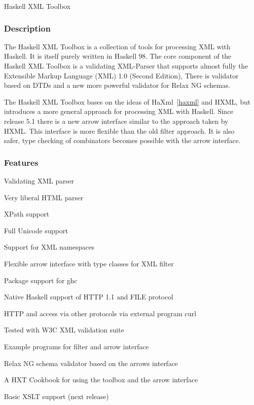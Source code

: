 \begin{hcarentry}[updated]{Haskell XML Toolbox}
\label{hxt}
\makeheader

\subsubsection*{Description}

The Haskell XML Toolbox is a collection of tools for processing XML with
Haskell. It is itself purely written in Haskell 98. The core component of the
Haskell XML Toolbox is a validating XML-Parser that supports
almost fully the Extensible Markup Language (XML) 1.0 (Second Edition),
There is validator based on DTDs and a new more powerful validator for
Relax NG schemas.

The Haskell XML Toolbox bases on the ideas of HaXml~\cref{haxml} and HXML,
but introduces a more general approach for processing XML with Haskell.
Since release 5.1 there is a new arrow interface similar to the approach
taken by HXML. This interface is more flexible than the old filter approach.
It is also safer, type checking of combinators becomes possible with the arrow
interface.

\subsubsection*{Features}

\begin{compactitem}
\item Validating XML parser
\item Very liberal HTML parser
\item XPath support
\item Full Unicode support
\item Support for XML namespaces
\item Flexible arrow interface with type classes for XML filter
\item Package support for ghc
\item Native Haskell support of HTTP 1.1 and FILE protocol
\item HTTP and access via other protocols via external program curl
\item Tested with W3C XML validation suite
\item Example programs for filter and arrow interface
\item Relax NG schema validator based on the arrows interface
\item A HXT Cookbook for using the toolbox and the arrow interface
\item Basic XSLT support (next release)
\end{compactitem}


\end{hcarentry}
